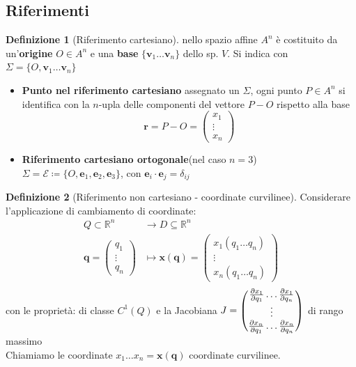 \documentclass[a4paper,10pt]{article}
\theoremstyle{definition}
\newcommand{\bv}{\boldsymbol} %
\newcommand{\re}{\mathbb{R}} %
\theoremstyle{indentdefinition}
\newtheorem{defn}{Definizione}[section]
\theoremstyle{indenttheorem}
\theoremstyle{myremark}
\theoremstyle{indentgeneral}
\begin{document}
\subsection{Riferimenti}
\begin{defn}[Riferimento cartesiano]
    nello spazio affine $A^n$ è costituito da un'\textbf{origine} $O\in A^n$ e una \textbf{base} $\{\bv{v}_1\dots \bv{v}_n\}$ dello sp. $V$. Si indica con $\Sigma=\{O, \bv{v}_1\dots \bv{v}_n\}$
    \begin{itemize}[leftmargin=15mm]
        \item \textbf{Punto nel riferimento cartesiano} assegnato un $\Sigma$, ogni punto $P\in A^n$ si identifica con la $n$-upla delle componenti del vettore $P-O$ rispetto alla base $$\bv{r}=P-O=\begin{pmatrix} x_1 \\ \vdots \\ x_n \end{pmatrix}$$
        \item \textbf{Riferimento cartesiano ortogonale}(nel caso $n=3$) $\Sigma=\mathscr{E}\coloneqq\{O,\bv{e}_1,\bv{e}_2,\bv{e}_3\}$, con $\bv{e}_i\cdot \bv{e}_j=\delta_{ij}$
    \end{itemize}
\end{defn}

\begin{defn}[Riferimento non cartesiano - coordinate curvilinee]
    Considerare l'applicazione di cambiamento di coordinate:
    \begin{align*}
    Q\subset \re^n  & \to  D \subseteq \re^n \\
       \bv{q}=\begin{pmatrix} q_1 \\ \vdots \\ q_n \end{pmatrix} & \mapsto  \bv{x}(\bv{q})=  \begin{pmatrix} x_1(q_1\dots q_n) \\ \vdots \\ x_n(q_1\dots q_n) \end{pmatrix}\\
    \end{align*}
    con le proprietà: di classe $C^1(Q)$ e la Jacobiana $J=\begin{pmatrix}
            \pdv{x_1}{q_1} \dots \pdv{x_1}{q_n} \\ \vdots \\ \pdv{x_n}{q_1} \dots \pdv{x_n}{q_n}
        \end{pmatrix}$ di rango massimo \\
        Chiamiamo le coordinate $x_1\dots x_n= \bv{x}(\bv{q})$ coordinate curvilinee.
\end{defn}
\end{document}
